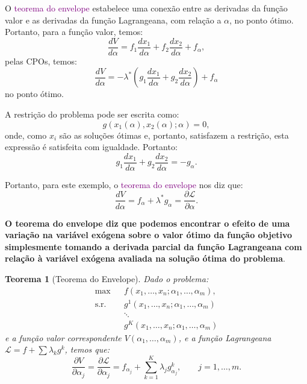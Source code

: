 \documentclass[12pt]{article}
\newtheorem{teo}{Teorema}
\begin{document}
O \textcolor{purple}{teorema do envelope} estabelece uma conexão entre as derivadas da função valor e as derivadas da função Lagrangeana, com relação a $\alpha$, no ponto ótimo. Portanto, para a função valor, temos:
\[
\frac{d V}{d\alpha} = f_1\frac{d x_1}{d\alpha} + f_2\frac{d x_2}{d\alpha} + f_\alpha,
\]
pelas CPOs, temos:
\[
\frac{d V}{d\alpha} = -\lambda^*\left(g_1 \frac{d x_1}{d\alpha} + g_2 \frac{d x_2}{d\alpha} \right) + f_\alpha
\]
no ponto ótimo.

A restrição do problema pode ser escrita como:
\[
g(x_1(\alpha), x_2(\alpha); \alpha) = 0,
\]
onde, como $x_i$ são as soluções ótimas e, portanto, satisfazem a restrição, esta expressão é satisfeita com igualdade. Portanto:
\[
g_1\frac{d x_1}{d\alpha} + g_2\frac{d x_2}{d\alpha} = -g_\alpha.
\]

Portanto, para este exemplo, o \textcolor{purple}{teorema do envelope} nos diz que:
\begin{equation}
    \frac{d V}{d\alpha} = f_\alpha + \lambda^* g_\alpha = \frac{\partial \mathcal{L}}{\partial\alpha}.
\end{equation}

\textbf{O teorema do envelope diz que podemos encontrar o efeito de uma variação na variável exógena sobre o valor ótimo da função objetivo simplesmente tomando a derivada parcial da função Lagrangeana com relação à variável exógena avaliada na solução ótima do problema}.

\begin{teo}[Teorema do Envelope]
    Dado o problema:
    \begin{eqnarray}
        \max && f(x_1, \dots, x_n; \alpha_1,\dots, \alpha_m), \\
        \text{s.r.} && g^1(x_1, \dots, x_n; \alpha_1, \dots, \alpha_m) \nonumber \\
        && \ddots \nonumber \\
        && g^K(x_1, \dots, x_n; \alpha_1, \dots, \alpha_m) \nonumber
    \end{eqnarray}
    e a função valor correspondente $V(\alpha_1, \dots, \alpha_m)$, e a função Lagrangeana $\mathcal{L} = f + \sum\lambda_kg^k$, temos que:
    \begin{equation}
        \frac{\partial V}{\partial\alpha_j} = \frac{\partial\mathcal{L}}{\partial\alpha_j} = f_{\alpha_j} + \sum_{k=1}^K \lambda_j g^k_{\alpha_j}, \qquad j=1,\dots,m.
    \end{equation}
\end{teo}
\end{document}
